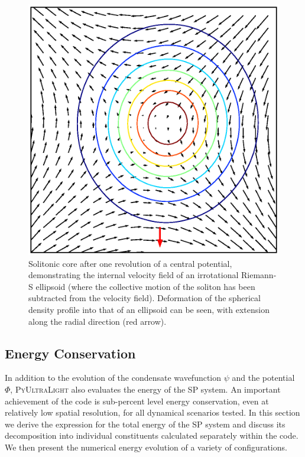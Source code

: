\documentclass[a4paper,11pt]{article}
\newcommand{\PyUltraLight}{\textsc{PyUltraLight}\xspace}
\begin{document}
\begin{figure}
  \includegraphics[width=1.\textwidth,trim=1cm 1cm 0 1cm,clip]{riemann}
  \caption{Solitonic core after one revolution of a central potential, demonstrating the internal velocity field of an irrotational Riemann-S ellipsoid (where the collective motion of the soliton has been subtracted from the velocity field). Deformation of the spherical density profile into that of an ellipsoid can be seen, with extension along the radial direction (red arrow).}
  \label{fig:riemann}
\end{figure}

\vspace{1em}

\subsection{Energy Conservation}\label{sec:energy}

In addition to the evolution of the condensate wavefunction $\psi$ and the potential $\Phi$, \PyUltraLight also evaluates the energy of the SP system. An important achievement of the code is sub-percent level energy conservation, even at relatively low spatial resolution, for all dynamical scenarios tested. In this section we derive the expression for the total energy of the SP system and discuss its decomposition into individual constituents calculated separately within the code. We then present the numerical energy evolution of a variety of configurations. 
\end{document}
